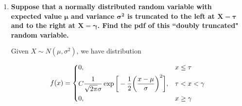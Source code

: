 \documentclass[10pt, oneside]{article}
\begin{document}
\begin{enumerate}[label=9.\arabic*]
\begin{enumerate}
	As in the case of the expectation, we similarly observe that the last line is equal to
	
	\[ = \frac{n(n-1)p^2}{1-p^n} \bigg[ \binom{n-2}{0} p^0 (1-p)^{n-2} + \cdots + \binom{n-2}{n-3} p^{n-3} (1-p) \bigg] \]
	
	which is merely the binomial expansion of $p$ and $1-p$ to $n-2$ terms, with the $n-2$-th term, $p^{n-2}$, omitted. Then we can conclude
	
	\begin{align*}
	E[X(X - 1)] = E[X^2] - E[X] &= n(n-1)p^2 \bigg( \frac{1-p^{n-2}}{1-p^n} \bigg) \\
	\implies E[X^2] &= n(n-1)p^2 \bigg( \frac{1-p^{n-2}}{1-p^n} \bigg) + np \bigg( \frac{1-p^{n-1}}{1-p^n} \bigg) \\
	&= \frac{np[np(1-p^{n-2}) + 1- p]}{1-p^n}
	\end{align*}
	
	Lastly, we calculate $E[X^2] - E[X]^2$. After some algebra, we can reduce the term down to:
	
	\begin{align*}
	E[X^2] - E[X]^2 &= \frac{np[np(1-p^{n-2}) + 1- p]}{1-p^n} - \bigg( np \bigg( \frac{1-p^{n-1}}{1-p^n} \bigg) \bigg)^2 \\
	&= \boxed{ np(1-p) \frac{ [(1-p^n) - np^{n-1} (1-p)] }{(1-p^n)^2} }
	\end{align*}
	
	Again, we observe an intuitive trait that the variance for the truncated binomial distribution is the variance for the untruncated version, $np(1-p)$, multiplied by a scaling factor.
	
	\end{enumerate}

\item  \begin{tcolorbox}[
  colback=Cerulean!5!white,
  colframe=Cerulean!75!black]
\textbf{Suppose that a normally distributed random variable with expected value $\bm{\mu}$ and variance $\bm{\sigma^2}$ is truncated to the left at $\bm{X = \tau}$ and to the right at $\bm{X = \gamma}$. Find the pdf of this ``doubly truncated" random variable.}
\end{tcolorbox}

Given $X \sim N(\mu, \sigma^2)$, we have distribution

\[
f(x) = \begin{dcases}
0, & x \leq \tau \\
C \frac{1}{\sqrt{2\pi} \sigma} \exp \bigg[ -\frac{1}{2} \bigg( \frac{x-\mu}{\sigma} \bigg)^2 \bigg], & \tau < x < \gamma \\
0, & x \geq \gamma
\end{dcases}
\]


\end{enumerate}
\end{document}
